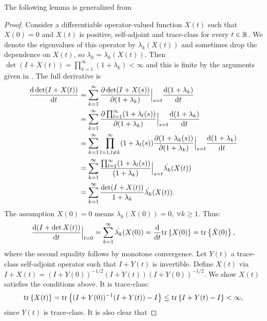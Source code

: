 The following lemma is generalized from \cite[Chapter 9, Theorem 4,
p. 127]{Lax07}
\lax
\begin{proof}
  Consider a differentiable operator-valued function $X(t)$ such that
  $X(0) = 0$ and $X(t)$ is positive, self-adjoint and trace-class for
  every $t\in \mathbb{R}$. We denote the eigenvalues of this operator by
  $\lambda_k(X(t))$ and sometimes drop the dependence on $X(t)$, so
  $\lambda_k = \lambda_k(X(t))$.  Then $\det (I+X(t))
  = \prod_{k=1}^{\infty} (1+\lambda_k) < \infty$ and this is finite by
  the arguments given in \cite{AlexanderianGloorGhattas14}. The full
  derivative is \begin{align*} \frac{\text{\textup{d}} \det (I+X(t))}{\text{\textup{d}} t}
    &= \sum_{k=1}^{\infty} 
    \frac{\partial \det (I+X(s))}{\partial (1+\lambda_k)}\Big |_{s=t}
    \frac{\text{\textup{d}} (1+\lambda_k)}{\text{\textup{d}} t} \\
    &= \sum_{k=1}^{\infty} \frac{\partial \prod_{l=1}^{\infty}
      (1+\lambda_l(s))}{\partial (1+\lambda_k)}\Big |_{s=t}
    \frac{\text{\textup{d}} (1+\lambda_k)}{\text{\textup{d}} t} \\
    &= \sum_{k=1}^{\infty} \prod_{l=1, l\neq k}^{\infty}
      (1+\lambda_l(s)) \frac{\partial (1+\lambda_k(s))}{\partial (1+\lambda_k)}\Big |_{s=t}
    \frac{\text{\textup{d}} (1+\lambda_k)}{\text{\textup{d}} t} \\
    &= \sum_{k=1}^{\infty} \frac{\prod_{l=1}^{\infty}
      (1+\lambda_l(s))}{(1+\lambda_k)}\Big |_{s=t}
    \dot{\lambda_k}(X(t)) \\
    &= \sum_{k=1}^{\infty} \frac{\det (I+X(t))}{1 +\lambda_k} \dot{\lambda_k}(X(t)).
  \end{align*}
  The assumption $X(0) = 0$ means $\lambda_k(X(0)) = 0,\ \forall k \geq 1$. Thus:
  \begin{align*}
    \frac{\text{\textup{d}} (I+\det X(t))}{\text{\textup{d}} t}\Big |_{t=0} 
    = \sum_{k=1}^{\infty} \dot{\lambda_k}(X(0)) 
    = \frac{\text{\textup{d}} }{\text{\textup{d}} t}\textup{tr}\left \{X(0) \right \}
    = \textup{tr}\left \{\dot{X}(0) \right \},
  \end{align*}
  where the second equality follows by monotone convergence. 
  Let $Y(t)$ a trace-class self-adjoint operator such that 
  $I+Y(t)$ is invertible.
  Define $X(t)$ via $I+X(t) = (I+Y(0))^{-1/2} (I+Y(t)) (I+Y(0))^{-1/2}$. 
  We show $X(t)$ satisfies the conditions above. It is trace-class:
  \begin{align*}
    \textup{tr}\left \{X(t) \right \} = \textup{tr}\left \{(I+Y(0))^{-1} (I+Y(t)) - I \right \}
    \leq \textup{tr}\left \{I+Y(t) - I \right \}< \infty,
  \end{align*}
  since $Y(t)$ is trace-class. It is also clear that

\end{proof}
